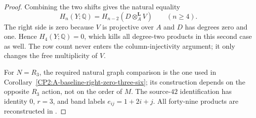 \begin{proof}
Combining the two shifts gives the natural equality
\[
 H_n(Y;\mathbb Q)
   =H_{n-2}(D\otimes_A^{\mathbf L}V)
                         \qquad(n\ge4).
\]
The right side is zero because $V$ is projective over
$A$ and $D$ has degrees zero and one.  Hence
$H_4(Y;\mathbb Q)=0$, which kills all degree-two
products in this second case as well.  The row count
never enters the column-injectivity argument; it only
changes the free multiplicity of $V$.

For $N=R_3$, the required natural graph comparison is
the one used in
Corollary~\ref{CP2:A-baseline-right-zero-three-six};
its construction depends on the opposite $R_3$ action,
not on the order of $M$.
The source-$42$ identification has identity $0$,
$r=3$, and band labels $e_{ij}=1+2i+j$.
All forty-nine products are reconstructed in
.
\end{proof}
